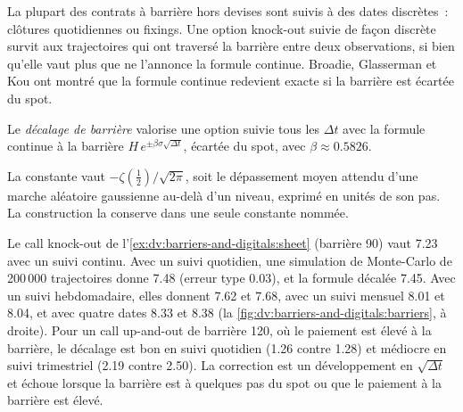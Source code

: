 La plupart des contrats à barrière hors devises sont suivis à des dates discrètes~: clôtures quotidiennes ou fixings. Une option knock-out suivie de
façon discrète survit aux trajectoires qui ont traversé la barrière entre deux observations, si bien qu'elle vaut plus que ne l'annonce la
formule continue. Broadie, Glasserman et Kou ont montré que la formule continue redevient exacte si
la barrière est écartée du spot.

\begin{definition}\label{def:dv:barriers-and-digitals:shift}
Le \emph{décalage de barrière} valorise une option suivie tous les $\Delta t$ avec la
formule continue à la barrière $H\,e^{\pm\beta\sigma\sqrt{\Delta t}}$, écartée du spot, avec $\beta\approx0.5826$.
\end{definition}

La constante vaut $-\zeta(\frac12)/\sqrt{2\pi}$, soit le dépassement moyen attendu d'une marche aléatoire gaussienne au-delà d'un niveau, exprimé en unités
de son pas. La construction la conserve dans une seule constante nommée.

\begin{example}\label{ex:dv:barriers-and-digitals:shift}
Le call knock-out de l'\cref{ex:dv:barriers-and-digitals:sheet} (barrière 90) vaut 7.23 avec un suivi continu. Avec
un suivi quotidien, une simulation de Monte-Carlo de 200\,000 trajectoires donne 7.48 (erreur type 0.03), et la formule décalée 7.45. Avec
un suivi hebdomadaire, elles donnent 7.62 et 7.68, avec un suivi mensuel 8.01 et 8.04, et avec quatre dates 8.33 et 8.38
(la \cref{fig:dv:barriers-and-digitals:barriers}, à droite). Pour un call up-and-out de barrière 120, où le paiement est
élevé à la barrière, le décalage est bon en suivi quotidien (1.26 contre 1.28) et médiocre en suivi trimestriel (2.19 contre 2.50). La correction est un développement en
$\sqrt{\Delta t}$ et échoue lorsque la barrière est à quelques pas du spot ou que le paiement à la barrière est
élevé.
\end{example}

